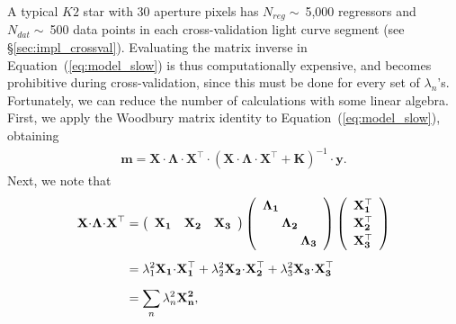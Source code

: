 \documentclass[]{emulateapj}
\begin{document}
A typical $K2$ star with 30 aperture pixels has $N_{reg} \sim\ $5,000 regressors and
$N_{dat} \sim\ $500 data points in each cross-validation light curve segment 
(see \S\ref{sec:impl_crossval}). Evaluating the matrix inverse in Equation~(\ref{eq:model_slow})
is thus computationally expensive, and becomes prohibitive during cross-validation,
since this must be done for every set of $\lambda_{n}$'s. Fortunately, we can reduce 
the number of calculations with some linear algebra. First, we apply the Woodbury matrix 
identity to Equation~(\ref{eq:model_slow}), obtaining
%
\begin{align}
\label{eq:model_woodbury}
\mathbf{m} =      \mathbf{X} \cdot \mathbf{\Lambda} \cdot \mathbf{X}^\top
                  \cdot
                  \left(
                  \mathbf{X} \cdot \mathbf{\Lambda} \cdot \mathbf{X}^\top + \mathbf{K}
                  \right)^{-1} 
                  \cdot
                  \mathbf{y}.
\end{align}
%
Next, we note that
%
\begin{align}
\label{eq:separable1}
\mathbf{X} \hspace{-2pt} \cdot \hspace{-2pt} \mathbf{\Lambda} \hspace{-2pt} \cdot \hspace{-2pt} \mathbf{X}^\top &= 
%
\left(
\begin{array}{ccc}
  \mathbf{X_1} & \mathbf{X_2} & \mathbf{X_3}
\end{array}
\right)
%
\left(
\begin{array}{ccc}
  \mathbf{\Lambda_1}\hspace*{-8pt}      &                                     & \\[2pt]
  &                                     \mathbf{\Lambda_2}\hspace*{-8pt}      & \\[2pt]
  &                                     &                                     \mathbf{\Lambda_3} \\
\end{array}
\right)
%
\left(
\begin{array}{c}
  \mathbf{X_1^\top} \\[2pt]
  \mathbf{X_2^\top} \\[2pt]
  \mathbf{X_3^\top} \\
\end{array}
\right) \nonumber\\[5pt]
%
&= \lambda_1^2 \mathbf{X_1} \hspace{-2pt} \cdot \hspace{-2pt} \mathbf{X^\top_1} +
   \lambda_2^2 \mathbf{X_2} \hspace{-2pt} \cdot \hspace{-2pt} \mathbf{X^\top_2} +
   \lambda_3^2 \mathbf{X_3} \hspace{-2pt} \cdot \hspace{-2pt} \mathbf{X^\top_3} \nonumber\\[5pt]
%
&= \sum_n \lambda_n^2 \mathbf{X^2_n},
\end{align}
\end{document}
